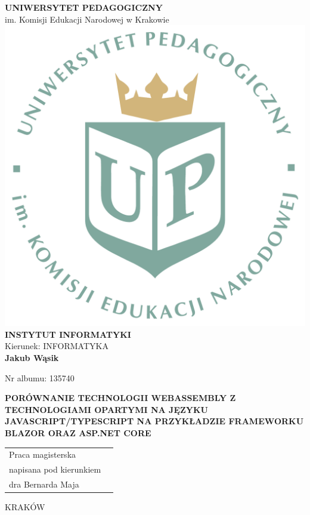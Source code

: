 \documentclass[12pt,a4paper,oneside]{book}
\begin{document}
\begin{titlepage}
\begin{center}
{\Large \textbf{UNIWERSYTET PEDAGOGICZNY}}\\[0.2cm]
{\Large im. Komisji Edukacji Narodowej w Krakowie}\\[0.3cm]

\includegraphics[scale=0.25]{images/logoUP_pl.pdf}\\[1cm]
{\large \textbf{INSTYTUT INFORMATYKI}}\\[0.2cm]
Kierunek: INFORMATYKA\\[0.2cm]

{\Large \textbf{Jakub Wąsik} \\[0.1cm] }

{\large Nr albumu: 135740 \\[0.1cm]}

{\LARGE \textbf{PORÓWNANIE TECHNOLOGII WEBASSEMBLY Z TECHNOLOGIAMI OPARTYMI NA
JĘZYKU JAVASCRIPT/TYPESCRIPT NA PRZYKŁADZIE FRAMEWORKU BLAZOR ORAZ
ASP.NET CORE} \\[2.0cm] }

\begin{flushright}
\large
  \begin{tabular}{ll}
	Praca magisterska\\
	napisana pod kierunkiem\\ 
	dra Bernarda Maja
  \end{tabular}
\end{flushright}


\vfill

{\large KRAKÓW \the\year}

\end{center}
\end{titlepage}
\end{document}
